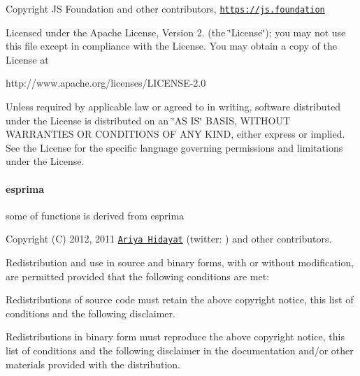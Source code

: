 Copyright JS Foundation and other contributors, \href{https://js.foundation}{\tt https\+://js.\+foundation}

Licensed under the Apache License, Version 2. (the \char`\"{}\+License\char`\"{}); you may not use this file except in compliance with the License. You may obtain a copy of the License at \begin{DoxyVerb}http://www.apache.org/licenses/LICENSE-2.0
\end{DoxyVerb}


Unless required by applicable law or agreed to in writing, software distributed under the License is distributed on an \char`\"{}\+A\+S I\+S\char`\"{} B\+A\+S\+IS, W\+I\+T\+H\+O\+UT W\+A\+R\+R\+A\+N\+T\+I\+ES OR C\+O\+N\+D\+I\+T\+I\+O\+NS OF A\+NY K\+I\+ND, either express or implied. See the License for the specific language governing permissions and limitations under the License.

\paragraph*{esprima}

some of functions is derived from esprima

Copyright (C) 2012, 2011 \href{http://ariya.ofilabs.com/about}{\tt Ariya Hidayat} (twitter\+: \href{http://twitter.com/ariyahidayat}{\tt }) and other contributors.

Redistribution and use in source and binary forms, with or without modification, are permitted provided that the following conditions are met\+:


\begin{DoxyItemize}
\item Redistributions of source code must retain the above copyright notice, this list of conditions and the following disclaimer.
\item Redistributions in binary form must reproduce the above copyright notice, this list of conditions and the following disclaimer in the documentation and/or other materials provided with the distribution.
\end{DoxyItemize}


